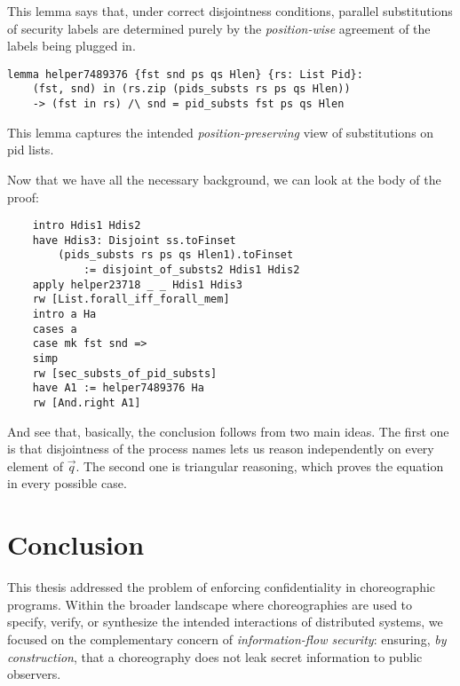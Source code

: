 \documentclass[12pt,a4paper,twoside]{book}
\begin{document}
This lemma says that, under correct disjointness conditions, parallel substitutions of security labels are determined purely by the \emph{position-wise} agreement of the labels being plugged in.
\begin{samepage}
\begin{verbatim}
lemma helper7489376 {fst snd ps qs Hlen} {rs: List Pid}:
    (fst, snd) in (rs.zip (pids_substs rs ps qs Hlen))
    -> (fst in rs) /\ snd = pid_substs fst ps qs Hlen
\end{verbatim}
\end{samepage}
This lemma captures the intended \emph{position-preserving} view of substitutions on pid lists.

Now that we have all the necessary background, we can look at the body of the proof:
\begin{samepage}
\begin{verbatim}
    intro Hdis1 Hdis2
    have Hdis3: Disjoint ss.toFinset
        (pids_substs rs ps qs Hlen1).toFinset
            := disjoint_of_substs2 Hdis1 Hdis2
    apply helper23718 _ _ Hdis1 Hdis3
    rw [List.forall_iff_forall_mem]
    intro a Ha
    cases a
    case mk fst snd =>
    simp
    rw [sec_substs_of_pid_substs]
    have A1 := helper7489376 Ha
    rw [And.right A1]
\end{verbatim}
\end{samepage}
And see that, basically, the conclusion follows from two main ideas. The first one is that disjointness of the process names lets us reason independently on every element of $\vec{q}$. The second one is triangular reasoning, which proves the equation in every possible case. 

\chapter{Conclusion}\label{chap:conclusion}
This thesis addressed the problem of enforcing confidentiality in choreographic programs. Within the broader landscape where choreographies are used to specify, verify, or synthesize the intended interactions of distributed systems, we focused on the complementary concern of \emph{information-flow security}: ensuring, \emph{by construction}, that a choreography does not leak secret information to public observers.
\end{document}
